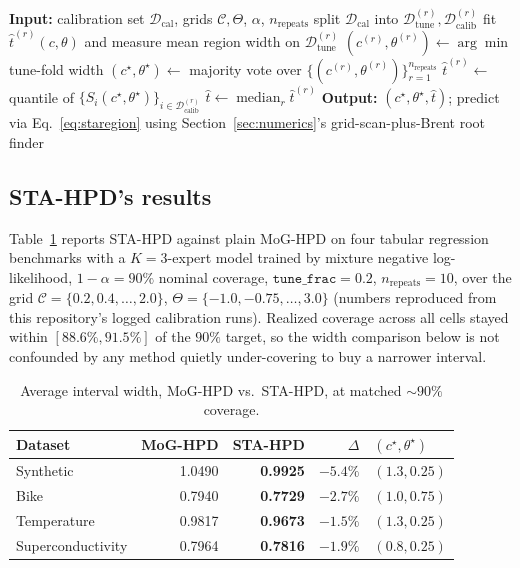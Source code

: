 \documentclass[11pt]{article}
\begin{document}
\begin{algorithm}[t]
\caption{STA-HPD fitting}
\label{alg:stahpd}
\begin{algorithmic}[1]
\State \textbf{Input:} calibration set $\mathcal D_{\mathrm{cal}}$, grids $\mathcal C,\Theta$,
$\alpha$, $n_{\mathrm{repeats}}$
  \State split $\mathcal D_{\mathrm{cal}}$ into $\mathcal D_{\mathrm{tune}}^{(r)}, \mathcal
D_{\mathrm{calib}}^{(r)}$
    \State fit $\hat t^{(r)}(c,\theta)$ and measure mean region width on $\mathcal
D_{\mathrm{tune}}^{(r)}$
  \EndFor
  \State $(c^{(r)},\theta^{(r)}) \gets \arg\min$ tune-fold width
\EndFor
\State $(c^\star,\theta^\star) \gets$ majority vote over $\{(c^{(r)},\theta^{(r)})\}_{r=1}^{n_{\mathrm{repeats}}}$
  \State $\hat t^{(r)} \gets$ quantile of $\{S_i(c^\star,\theta^\star)\}_{i\in\mathcal
D_{\mathrm{calib}}^{(r)}}$
\EndFor
\State $\hat t \gets \operatorname{median}_r \hat t^{(r)}$
\State \textbf{Output:} $(c^\star,\theta^\star,\hat t)$; predict via
Eq.~\eqref{eq:staregion} using Section~\ref{sec:numerics}'s grid-scan-plus-Brent root finder
\end{algorithmic}
\end{algorithm}

\subsection{STA-HPD's results}
\label{sec:results}

Table~\ref{tab:stahpd-results} reports STA-HPD against plain MoG-HPD on four tabular regression
benchmarks with a $K=3$-expert model trained by mixture negative log-likelihood, $1-\alpha=90\%$
nominal coverage, $\texttt{tune\_frac}=0.2$, $n_{\mathrm{repeats}}=10$, over the grid
$\mathcal C=\{0.2,0.4,\dots,2.0\}$, $\Theta=\{-1.0,-0.75,\dots,3.0\}$ (numbers reproduced from this
repository's logged calibration runs). Realized coverage across all cells stayed within
$[88.6\%,91.5\%]$ of the $90\%$ target, so the width comparison below is not confounded by any
method quietly under-covering to buy a narrower interval.

\begin{table}[h]
\centering
\caption{Average interval width, MoG-HPD vs.\ STA-HPD, at matched $\sim\!90\%$ coverage.}
\label{tab:stahpd-results}
\begin{tabular}{@{}lrrrl@{}}
\toprule
\textbf{Dataset} & \textbf{MoG-HPD} & \textbf{STA-HPD} & $\Delta$ & $(c^\star,\theta^\star)$ \\
\midrule
Synthetic & 1.0490 & \textbf{0.9925} & $-5.4\%$ & $(1.3, 0.25)$ \\
Bike & 0.7940 & \textbf{0.7729} & $-2.7\%$ & $(1.0, 0.75)$ \\
Temperature & 0.9817 & \textbf{0.9673} & $-1.5\%$ & $(1.3, 0.25)$ \\
Superconductivity & 0.7964 & \textbf{0.7816} & $-1.9\%$ & $(0.8, 0.25)$ \\
\bottomrule
\end{tabular}
\end{table}
\end{document}
